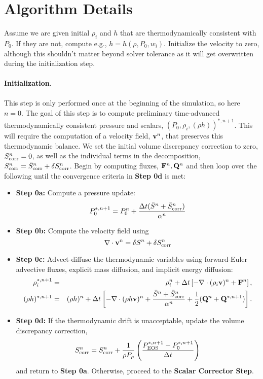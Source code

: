 \documentclass[final]{siamltex}
\def\Fb {{\bf F}}
\def\Qb {{\bf Q}}
\def\vb {{\bf v}}
\begin{document}
\section{Algorithm Details}
Assume we are given initial $\rho_i$ and $h$ that are thermodynamically consistent with 
$P_0$.  If they are not, compute e.g., $h = h(\rho,P_0,w_i)$.  Initialize the velocity
to zero, although this shouldn't matter beyond solver tolerance as it will get 
overwritten during the initialization step.\\ \\
{\bf Initialization}.\\ \\
This step is only performed once at the beginning of the simulation, so here $n=0$.
The goal of this step is to compute preliminary time-advanced thermodynamically
consistent pressure and scalars, $(P_0,\rho_i,(\rho h))^{*,n+1}$.  This will
require the computation of a velocity field, $\vb^n$, that preserves this
thermodynamic balance.  
We set the initial volume discrepancy correction to zero, 
$S_{\rm corr}^n = 0$, as well as the individual terms in the decomposition,
$S_{\rm corr}^n = \bar{S}_{\rm corr}^n + \delta S_{\rm corr}^n$.
Begin by computing fluxes, $\Fb^n, \Qb^n$ and then
loop over the following until the convergence criteria in {\bf Step 0d} is met:\\
\begin{itemize}
\item {\bf Step 0a:} Compute a pressure update:
\begin{equation}
P_0^{*,n+1} = P_0^n + \frac{\Delta t(\bar{S}^n + \bar{S}_{\rm corr}^n)}{\alpha^n}
\end{equation}
\item {\bf Step 0b:} Compute the velocity field using
\begin{equation}
\nabla\cdot\vb^n = \delta S^n + \delta S_{\rm corr}^n
\end{equation}
\item {\bf Step 0c:} Advect-diffuse the thermodynamic variables using forward-Euler advective fluxes,
explicit mass diffusion, and implicit energy diffusion:
\begin{eqnarray}
\rho_i^{*,n+1} &=& \rho_i^n + \Delta t\left[-\nabla\cdot(\rho_i\vb)^n + \Fb^n\right], \\
(\rho h)^{*,n+1} &=& (\rho h)^n + \Delta t\left[-\nabla\cdot(\rho h\vb)^n + \frac{\bar{S}^n + \bar{S}_{\rm corr}^n}{\alpha^n} + \frac{1}{2}(\Qb^n + \Qb^{*,n+1})\right].\nonumber\\
\end{eqnarray}
\item {\bf Step 0d:} If the thermodynamic drift is unacceptable, update the volume 
discrepancy correction,
\begin{equation}
S_{\rm corr}^n = S_{\rm corr}^n + \frac{1}{\rho P_\rho}\left(\frac{P_{\rm EOS}^{*,n+1} - P_0^{*,n+1}}{\Delta t}\right)
\end{equation}
and return to {\bf Step 0a}.  Otherwise, proceed to the {\bf Scalar Corrector Step}.\\
\end{itemize}
\end{document}
